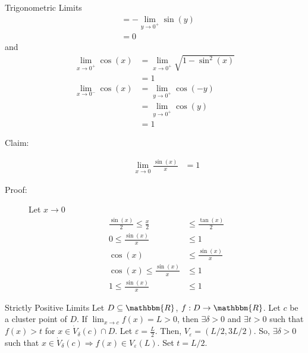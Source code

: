 \documentclass[10pt]{extarticle}
\newcommand{\R}{\mathbbm{R}}
\begin{document}
\begin{problem}{Trigonometric Limits}
\begin{align*}
                                       &= -\lim_{y\rightarrow 0^{+}}\sin(y)\\
                                       &= 0
    \end{align*}
    and
    \begin{align*}
      \lim_{x\rightarrow 0^+} \cos(x) &= \lim_{x\rightarrow 0^{+}} \sqrt{1-\sin^2(x)}\\
                                      &= 1\\
      \lim_{x\rightarrow 0^{-}} \cos(x) &= \lim_{y\rightarrow 0^{+}} \cos(-y)\\
                                        &= \lim_{y\rightarrow 0^{+}}\cos(y)\\
                                        &= 1
    \end{align*}
    \begin{description}
      \item[Claim:] 
        \begin{align*}
          \lim_{x\rightarrow 0}\frac{\sin(x)}{x} &= 1
        \end{align*}
      \item[Proof:] Let $x\rightarrow 0$
        \begin{align*}
          \frac{\sin(x)}{2} \leq \frac{x}{2} &\leq \frac{\tan(x)}{2}\\
          0 \leq \frac{\sin(x)}{x} &\leq 1\\
          \cos(x) &\leq \frac{\sin(x)}{x}\\
          \cos(x) \leq \frac{\sin(x)}{x} &\leq 1\\
          1 \leq \frac{\sin(x)}{x} &\leq 1
        \end{align*}
    \end{description}
  \end{problem}
  \begin{problem}{Strictly Positive Limits}
    Let $D\subseteq \R$, $f:D\rightarrow \R$. Let $c$ be a cluster point of $D$. If $\lim_{x\rightarrow c}f(x) = L > 0$, then $\exists \delta > 0$ and $\exists t > 0$ such that $f(x) > t$ for $x\in \dot{V}_{\delta}(c) \cap D$.
    \tcblower
    Let $\varepsilon = \frac{L}{2}$. Then, $V_{\varepsilon} = (L/2,3L/2)$. So, $\exists \delta > 0$ such that $x\in \dot{V}_{\delta}(c) \Rightarrow f(x) \in V_{\varepsilon}(L)$. Set $t = L/2$.
  \end{problem}
\end{document}
